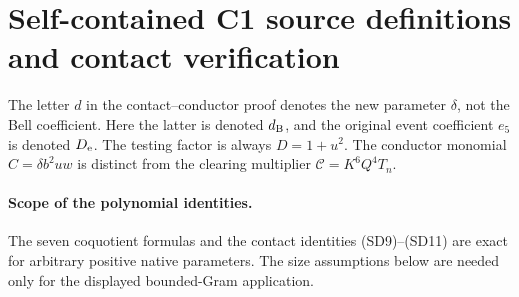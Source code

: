 \section{\texorpdfstring{Self-contained C1 source definitions and contact verification}{Self-contained C1 source definitions and contact verification}}
\label{component:p0acdb66bba2f}

\label{p0acdb66bba2f:app:c1-source-definitions}

The letter $d$ in the contact--conductor proof denotes the new parameter
$\delta$, not the Bell coefficient. Here the latter is denoted $d_{\rm B}$,
and the original event coefficient $e_5$ is denoted $D_{\rm e}$.
The testing factor is always $D=1+u^2$. The conductor monomial
$C=\delta b^2uw$ is distinct from the clearing multiplier
$\mathcal C=K^6Q^4T_n$.

\label{component:pfecc204a8025}
\label{pfecc204a8025:app:c1-native}
\paragraph{Scope of the polynomial identities.} The seven coquotient formulas and the contact identities (SD9)--(SD11) are exact for arbitrary positive native parameters. The size assumptions below are needed only for the displayed bounded-Gram application.
